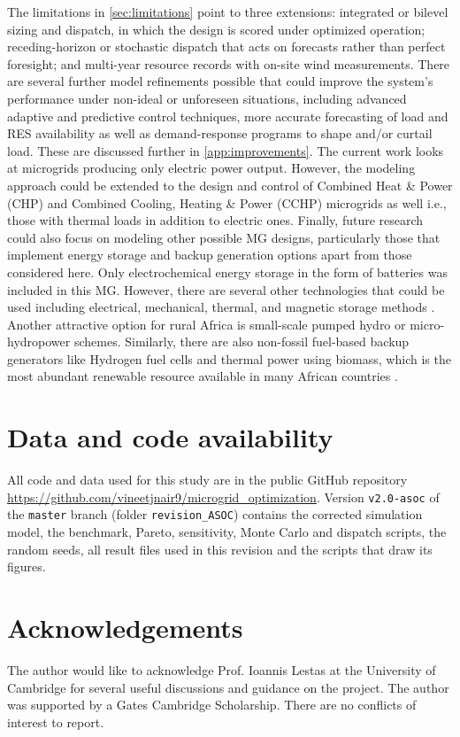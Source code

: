 \documentclass[final,3p,times]{elsarticle}
\begin{document}
The limitations in \cref{sec:limitations} point to three extensions: integrated or bilevel sizing and dispatch, in which the design is scored under optimized operation; receding-horizon or stochastic dispatch that acts on forecasts rather than perfect foresight; and multi-year resource records with on-site wind measurements. There are several further model refinements possible that could improve the system's performance under non-ideal or unforeseen situations, including advanced adaptive and predictive control techniques, more accurate forecasting of load and RES availability as well as demand-response programs to shape and/or curtail load. These are discussed further in \cref{app:improvements}. The current work looks at microgrids producing only electric power output. However, the modeling approach could be extended to the design and control of Combined Heat \& Power (CHP) and Combined Cooling, Heating \& Power (CCHP) microgrids as well i.e., those with thermal loads in addition to electric ones. Finally, future research could also focus on modeling other possible MG designs, particularly those that implement energy storage and backup generation options apart from those considered here. Only electrochemical energy storage in the form of batteries was included in this MG. However, there are several other technologies that could be used including electrical, mechanical, thermal, and magnetic storage methods \cite{ESS_control}. Another attractive option for rural Africa is small-scale pumped hydro or micro-hydropower schemes. Similarly, there are also non-fossil fuel-based backup generators like Hydrogen fuel cells and thermal power using biomass, which is the most abundant renewable resource available in many African countries \cite{usea}.

\section{Data and code availability}

All code and data used for this study are in the public GitHub repository \url{https://github.com/vineetjnair9/microgrid_optimization}. Version \texttt{v2.0-asoc} of the \texttt{master} branch (folder \texttt{revision\_ASOC}) contains the corrected simulation model, the benchmark, Pareto, sensitivity, Monte Carlo and dispatch scripts, the random seeds, all result files used in this revision and the scripts that draw its figures.

\section{Acknowledgements}
The author would like to acknowledge Prof. Ioannis Lestas at the University of Cambridge for several useful discussions and guidance on the project. The author was supported by a Gates Cambridge Scholarship. There are no conflicts of interest to report.
\end{document}
